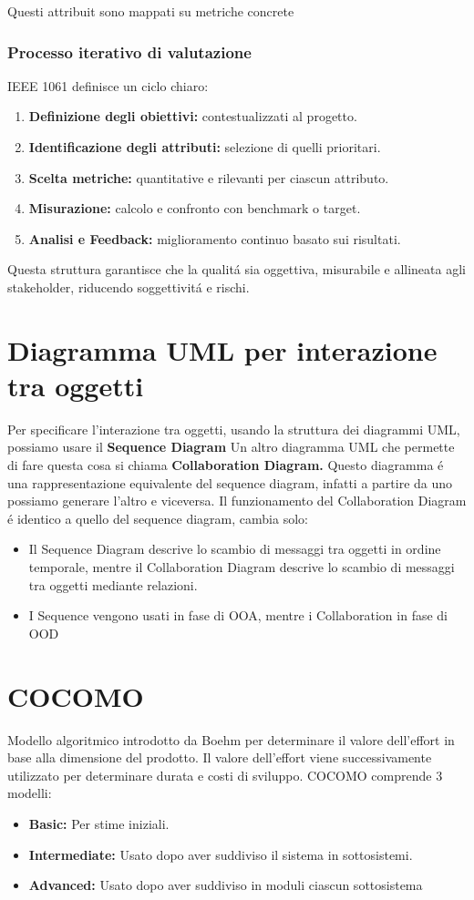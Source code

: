\documentclass[11pt]{article}
\begin{document}
Questi attribuit sono mappati su metriche concrete
\subsubsection{Processo iterativo di valutazione}
\label{sec:org0252b6c}
IEEE 1061 definisce un ciclo chiaro:
\begin{enumerate}
\item \textbf{\textbf{Definizione degli obiettivi:}} contestualizzati al progetto.
\item \textbf{\textbf{Identificazione degli attributi:}} selezione di quelli prioritari.
\item \textbf{\textbf{Scelta metriche:}} quantitative e rilevanti per ciascun attributo.
\item \textbf{\textbf{Misurazione:}} calcolo e confronto con benchmark o target.
\item \textbf{\textbf{Analisi e Feedback:}} miglioramento continuo basato sui risultati.
\end{enumerate}

Questa struttura garantisce che la qualitá sia oggettiva, misurabile e allineata agli stakeholder, riducendo soggettivitá e rischi.
\section{Diagramma UML per interazione tra oggetti}
\label{sec:orgdd5f51b}
Per specificare l'interazione tra oggetti, usando la struttura dei diagrammi UML, possiamo usare il \textbf{\textbf{Sequence Diagram}}
Un altro diagramma UML che permette di fare questa cosa si chiama \textbf{\textbf{Collaboration Diagram.}}
Questo diagramma é una rappresentazione equivalente del sequence diagram, infatti a partire da uno possiamo generare l'altro e viceversa.
Il funzionamento del Collaboration Diagram é identico a quello del sequence diagram, cambia solo:
\begin{itemize}
\item Il Sequence Diagram descrive lo scambio di messaggi tra oggetti in ordine temporale, mentre il Collaboration Diagram descrive lo scambio di messaggi tra oggetti mediante relazioni.
\item I Sequence vengono usati in fase di OOA, mentre i Collaboration in fase di OOD
\end{itemize}
\section{COCOMO}
\label{sec:org28562d8}
Modello algoritmico introdotto da Boehm per determinare il valore dell'effort in base alla dimensione del prodotto.
Il valore dell'effort viene successivamente utilizzato per determinare durata e costi di sviluppo.
COCOMO comprende 3 modelli:
\begin{itemize}
\item \textbf{\textbf{Basic:}} Per stime iniziali.
\item \textbf{\textbf{Intermediate:}} Usato dopo aver suddiviso il sistema in sottosistemi.
\item \textbf{\textbf{Advanced:}} Usato dopo aver suddiviso in moduli ciascun sottosistema
\end{itemize}
\end{document}
